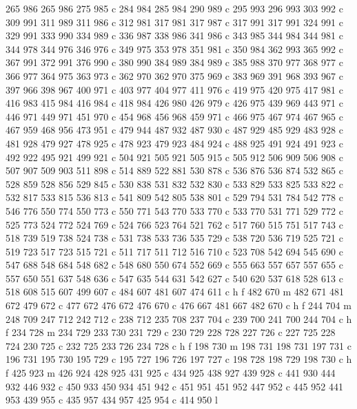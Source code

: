 {{   265 986 265 986 275 985 c
   284 984 285 984 290 989 c
   295 993 296 993 303 992 c
   309 991 311 989 311 986 c
   312 981 317 981 317 987 c
   317 991 317 991 324 991 c
   329 991 333 990 334 989 c
   336 987 338 986 341 986 c
   343 985 344 984 344 981 c
   344 978 344 976 346 976 c
   349 975 353 978 351 981 c
   350 984 362 993 365 992 c
   367 991 372 991 376 990 c
   380 990 384 989 384 989 c
   385 988 370 977 368 977 c
   366 977 364 975 363 973 c
   362 970 362 970 375 969 c
   383 969 391 968 393 967 c
   397 966 398 967 400 971 c
   403 977 404 977 411 976 c
   419 975 420 975 417 981 c
   416 983 415 984 416 984 c
   418 984 426 980 426 979 c
   426 975 439 969 443 971 c
   446 971 449 971 451 970 c
   454 968 456 968 459 971 c
   466 975 467 974 467 965 c
   467 959 468 956 473 951 c
   479 944 487 932 487 930 c
   487 929 485 929 483 928 c
   481 928 479 927 478 925 c
   478 923 479 923 484 924 c
   488 925 491 924 491 923 c
   492 922 495 921 499 921 c
   504 921 505 921 505 915 c
   505 912 506 909 506 908 c
   507 907 509 903 511 898 c
   514 889 522 881 530 878 c
   536 876 536 874 532 865 c
   528 859 528 856 529 845 c
   530 838 531 832 532 830 c
   533 829 533 825 533 822 c
   532 817 533 815 536 813 c
   541 809 542 805 538 801 c
   529 794 531 784 542 778 c
   546 776 550 774 550 773 c
   550 771 543 770 533 770 c
   533 770 531 771 529 772 c
   525 773 524 772 524 769 c
   524 766 523 764 521 762 c
   517 760 515 751 517 743 c
   518 739 519 738 524 738 c
   531 738 533 736 535 729 c
   538 720 536 719 525 721 c
   519 723 517 723 515 721 c
   511 717 511 712 516 710 c
   523 708 542 694 545 690 c
   547 688 548 684 548 682 c
   548 680 550 674 552 669 c
   555 663 557 657 557 655 c
   557 650 551 637 548 636 c
   547 635 544 631 542 627 c
   540 620 537 618 528 613 c
   518 608 515 607 499 607 c
   484 607 481 607 474 611 c
   h f
   482 670 m
   482 671 481 672 479 672 c
   477 672 476 672 476 670 c
   476 667 481 667 482 670 c
   h f
   244 704 m
   248 709 247 712 242 712 c
   238 712 235 708 237 704 c
   239 700 241 700 244 704 c
   h f
   234 728 m
   234 729 233 730 231 729 c
   230 729 228 728 227 726 c
   227 725 228 724 230 725 c
   232 725 233 726 234 728 c
   h f
   198 730 m
   198 731 198 731 197 731 c
   196 731 195 730 195 729 c
   195 727 196 726 197 727 c
   198 728 198 729 198 730 c
   h f
   425 923 m
   426 924 428 925 431 925 c
   434 925 438 927 439 928 c
   441 930 444 932 446 932 c
   450 933 450 934 451 942 c
   451 951 451 952 447 952 c
   445 952 441 953 439 955 c
   435 957 434 957 425 954 c
   414 950 l
}}
